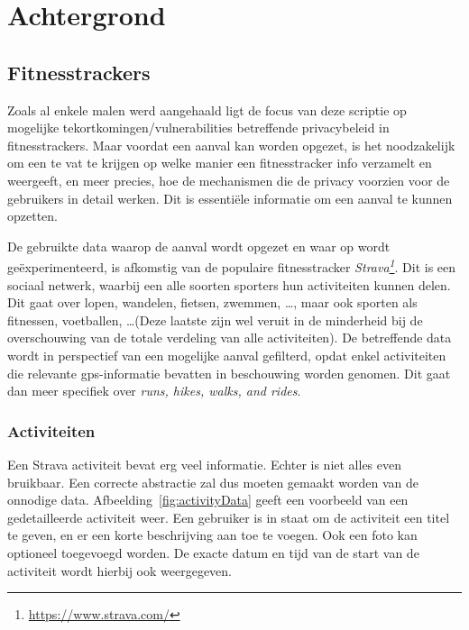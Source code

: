 
\chapter{Achtergrond}

\section{Fitnesstrackers}
Zoals al enkele malen werd aangehaald ligt de focus van deze scriptie op
mogelijke tekortkomingen/vulnerabilities betreffende privacybeleid in
fitnesstrackers. Maar voordat een aanval kan worden opgezet, is het
noodzakelijk om een te vat te krijgen op welke manier een fitnesstracker info
verzamelt en weergeeft, en meer precies, hoe de mechanismen die de privacy
voorzien voor de gebruikers in detail werken. Dit is essentiële informatie om
een aanval te kunnen opzetten.

De gebruikte data waarop de aanval wordt opgezet en waar op wordt
geëxperimenteerd, is afkomstig van de populaire fitnesstracker
\textit{Strava\footnote{\url{https://www.strava.com/}}}. Dit is een sociaal
netwerk, waarbij een alle soorten sporters hun activiteiten kunnen delen. Dit
gaat over lopen, wandelen, fietsen, zwemmen, \ldots, maar ook sporten als
fitnessen, voetballen, \ldots (Deze laatste zijn wel veruit in de minderheid
bij de overschouwing van de totale verdeling van alle
activiteiten\cite{Stravas24:online}). De betreffende data wordt in perspectief
van een mogelijke aanval gefilterd, opdat enkel activiteiten die relevante
gps-informatie bevatten in beschouwing worden genomen. Dit gaat dan meer
specifiek over \textit{runs, hikes, walks, and rides}.

\subsection{Activiteiten}
Een Strava activiteit bevat erg veel informatie. Echter is niet alles even
bruikbaar. Een correcte abstractie zal dus moeten gemaakt worden van de
onnodige data. Afbeelding~\ref{fig:activityData} geeft een voorbeeld van een
gedetailleerde activiteit weer. Een gebruiker is in staat om de activiteit een
titel te geven, en er een korte beschrijving aan toe te voegen. Ook een foto
kan optioneel toegevoegd worden. De exacte datum en tijd van de start van de
activiteit wordt hierbij ook weergegeven.

